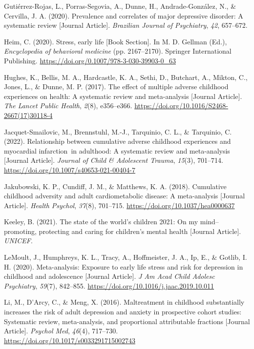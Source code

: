 \documentclass[
  letterpaper,
  DIV=11,
  numbers=noendperiod]{scrreport}
\newlength{\cslhangindent}
\newenvironment{CSLReferences}[2] %
 {\begin{list}{}{%
  \setlength{\itemindent}{0pt}
  \setlength{\leftmargin}{0pt}
  \setlength{\parsep}{0pt}
  \ifodd #1
   \setlength{\leftmargin}{\cslhangindent}
   \setlength{\itemindent}{-1\cslhangindent}
  \fi
  \setlength{\itemsep}{#2\baselineskip}}}
 {\end{list}}
\begin{document}
\begin{CSLReferences}{1}{0}
Gutiérrez-Rojas, L., Porras-Segovia, A., Dunne, H., Andrade-González,
N., \& Cervilla, J. A. (2020). Prevalence and correlates of major
depressive disorder: A systematic review {[}Journal Article{]}.
\emph{Brazilian Journal of Psychiatry}, \emph{42}, 657--672.

Heim, C. (2020). Stress, early life {[}Book Section{]}. In M. D. Gellman
(Ed.), \emph{Encyclopedia of behavioral medicine} (pp. 2167--2170).
Springer International Publishing.
\url{https://doi.org/0.1007/978-3-030-39903-0_63}

Hughes, K., Bellis, M. A., Hardcastle, K. A., Sethi, D., Butchart, A.,
Mikton, C., Jones, L., \& Dunne, M. P. (2017). The effect of multiple
adverse childhood experiences on health: A systematic review and
meta-analysis {[}Journal Article{]}. \emph{The Lancet Public Health},
\emph{2}(8), e356--e366.
\url{https://doi.org/10.1016/S2468-2667(17)30118-4}

Jacquet-Smailovic, M., Brennstuhl, M.-J., Tarquinio, C. L., \&
Tarquinio, C. (2022). Relationship between cumulative adverse childhood
experiences and myocardial infarction~in adulthood: A systematic review
and meta-analysis {[}Journal Article{]}. \emph{Journal of Child \&
Adolescent Trauma}, \emph{15}(3), 701--714.
\url{https://doi.org/10.1007/s40653-021-00404-7}

Jakubowski, K. P., Cundiff, J. M., \& Matthews, K. A. (2018). Cumulative
childhood adversity and adult cardiometabolic disease: A meta-analysis
{[}Journal Article{]}. \emph{Health Psychol}, \emph{37}(8), 701--715.
\url{https://doi.org/10.1037/hea0000637}

Keeley, B. (2021). The state of the world's children 2021: On my
mind--promoting, protecting and caring for children's mental health
{[}Journal Article{]}. \emph{UNICEF}.

LeMoult, J., Humphreys, K. L., Tracy, A., Hoffmeister, J. A., Ip, E., \&
Gotlib, I. H. (2020). Meta-analysis: Exposure to early life stress and
risk for depression in childhood and adolescence {[}Journal Article{]}.
\emph{J Am Acad Child Adolesc Psychiatry}, \emph{59}(7), 842--855.
\url{https://doi.org/10.1016/j.jaac.2019.10.011}

Li, M., D'Arcy, C., \& Meng, X. (2016). Maltreatment in childhood
substantially increases the risk of adult depression and anxiety in
prospective cohort studies: Systematic review, meta-analysis, and
proportional attributable fractions {[}Journal Article{]}. \emph{Psychol
Med}, \emph{46}(4), 717--730.
\url{https://doi.org/10.1017/s0033291715002743}


\end{CSLReferences}
\end{document}
